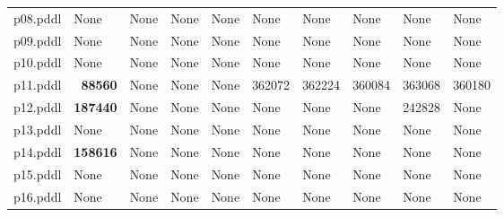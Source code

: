 \documentclass{article}
\begin{document}
\begin{tabular}{@{}lrrrrrrrrr@{}}
p08.pddl & \multicolumn{1}{|l|}{None} & \multicolumn{1}{|l|}{None} & \multicolumn{1}{|l|}{None} & \multicolumn{1}{|l|}{None} & \multicolumn{1}{|l|}{None} & \multicolumn{1}{|l|}{None} & \multicolumn{1}{|l|}{None} & \multicolumn{1}{|l|}{None} & \multicolumn{1}{|l|}{None} \\
p09.pddl & \multicolumn{1}{|l|}{None} & \multicolumn{1}{|l|}{None} & \multicolumn{1}{|l|}{None} & \multicolumn{1}{|l|}{None} & \multicolumn{1}{|l|}{None} & \multicolumn{1}{|l|}{None} & \multicolumn{1}{|l|}{None} & \multicolumn{1}{|l|}{None} & \multicolumn{1}{|l|}{None} \\
p10.pddl & \multicolumn{1}{|l|}{None} & \multicolumn{1}{|l|}{None} & \multicolumn{1}{|l|}{None} & \multicolumn{1}{|l|}{None} & \multicolumn{1}{|l|}{None} & \multicolumn{1}{|l|}{None} & \multicolumn{1}{|l|}{None} & \multicolumn{1}{|l|}{None} & \multicolumn{1}{|l|}{None} \\
p11.pddl & \textbf{88560} & \multicolumn{1}{|l|}{None} & \multicolumn{1}{|l|}{None} & \multicolumn{1}{|l|}{None} & 362072 & 362224 & 360084 & 363068 & 360180 \\
p12.pddl & \textbf{187440} & \multicolumn{1}{|l|}{None} & \multicolumn{1}{|l|}{None} & \multicolumn{1}{|l|}{None} & \multicolumn{1}{|l|}{None} & \multicolumn{1}{|l|}{None} & \multicolumn{1}{|l|}{None} & 242828 & \multicolumn{1}{|l|}{None} \\
p13.pddl & \multicolumn{1}{|l|}{None} & \multicolumn{1}{|l|}{None} & \multicolumn{1}{|l|}{None} & \multicolumn{1}{|l|}{None} & \multicolumn{1}{|l|}{None} & \multicolumn{1}{|l|}{None} & \multicolumn{1}{|l|}{None} & \multicolumn{1}{|l|}{None} & \multicolumn{1}{|l|}{None} \\
p14.pddl & \textbf{158616} & \multicolumn{1}{|l|}{None} & \multicolumn{1}{|l|}{None} & \multicolumn{1}{|l|}{None} & \multicolumn{1}{|l|}{None} & \multicolumn{1}{|l|}{None} & \multicolumn{1}{|l|}{None} & \multicolumn{1}{|l|}{None} & \multicolumn{1}{|l|}{None} \\
p15.pddl & \multicolumn{1}{|l|}{None} & \multicolumn{1}{|l|}{None} & \multicolumn{1}{|l|}{None} & \multicolumn{1}{|l|}{None} & \multicolumn{1}{|l|}{None} & \multicolumn{1}{|l|}{None} & \multicolumn{1}{|l|}{None} & \multicolumn{1}{|l|}{None} & \multicolumn{1}{|l|}{None} \\
p16.pddl & \multicolumn{1}{|l|}{None} & \multicolumn{1}{|l|}{None} & \multicolumn{1}{|l|}{None} & \multicolumn{1}{|l|}{None} & \multicolumn{1}{|l|}{None} & \multicolumn{1}{|l|}{None} & \multicolumn{1}{|l|}{None} & \multicolumn{1}{|l|}{None} & \multicolumn{1}{|l|}{None} \\

\end{tabular}
\end{document}
